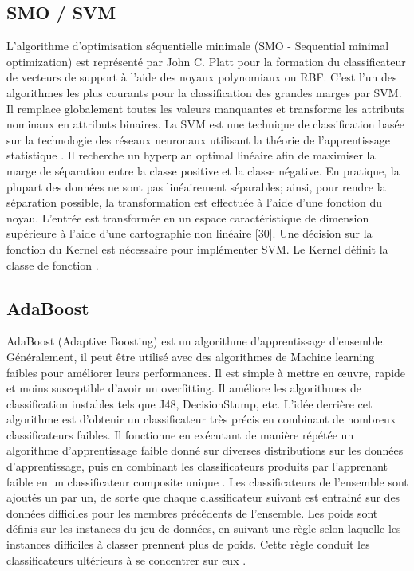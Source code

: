 \subsection{SMO / SVM}
L'algorithme d'optimisation séquentielle minimale (SMO - Sequential minimal optimization) \cite{ML29} est représenté par John C. Platt pour la formation du classificateur de vecteurs de support à l'aide des noyaux polynomiaux ou RBF. C'est l'un des algorithmes les plus courants pour la classification des grandes marges par SVM. Il remplace globalement toutes les valeurs manquantes et transforme les attributs nominaux en attributs binaires. La SVM est une technique de classification basée sur la technologie des réseaux neuronaux utilisant la théorie de l'apprentissage statistique \cite{ML30}. Il recherche un hyperplan optimal linéaire afin de maximiser la marge de séparation entre la classe positive et la classe négative. En pratique, la plupart des données ne sont pas linéairement séparables; ainsi, pour rendre la séparation possible, la transformation est effectuée à l'aide d'une fonction du noyau. L'entrée est transformée en un espace caractéristique de dimension supérieure à l'aide d'une cartographie non linéaire [30]. Une décision sur la fonction du Kernel est nécessaire pour implémenter SVM. Le Kernel définit la classe de fonction \cite{ML31}.

\subsection{AdaBoost}
AdaBoost (Adaptive Boosting) \cite{ML32} est un algorithme d'apprentissage d'ensemble. Généralement, il peut être utilisé avec des algorithmes de Machine learning faibles pour améliorer leurs performances. Il est simple à mettre en œuvre, rapide et moins susceptible d'avoir un overfitting. Il améliore les algorithmes de classification instables tels que J48, DecisionStump, etc. L'idée derrière cet algorithme est d'obtenir un classificateur très précis en combinant de nombreux classificateurs faibles. Il fonctionne en exécutant de manière répétée un algorithme d'apprentissage faible donné sur diverses distributions sur les données d'apprentissage, puis en combinant les classificateurs produits par l'apprenant faible en un classificateur composite unique \cite{ML33}. Les classificateurs de l'ensemble sont ajoutés un par un, de sorte que chaque classificateur suivant est entrainé sur des données difficiles pour les membres précédents de l'ensemble. Les poids sont définis sur les instances du jeu de données, en suivant une règle selon laquelle les instances difficiles à classer prennent plus de poids. Cette règle conduit les classificateurs ultérieurs à se concentrer sur eux \cite{ML34}.

